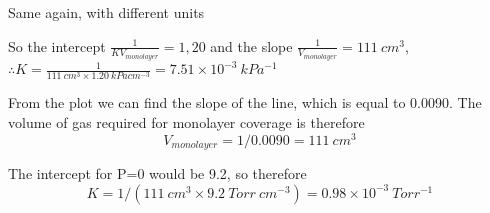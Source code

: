 \documentclass[ignorenonframetext]{beamer}
\begin{document}
\begin{example}{Same again, with different units}

So the intercept \(\frac{1}{KV_{monolayer}} = 1,20\) and the slope \(\frac{1}{V_{monolayer}} = 111\ cm^3\), \(\therefore K=\frac{1}{111\ cm^3\times 1.20\ kPacm^{-3}} = 7.51 \times 10^{-3}\ kPa^{-1}\)

From the plot we can find the slope of the line, which is equal to 0.0090. The volume of gas required for monolayer coverage is therefore \[V_{monolayer} = 1/0.0090 = 111\ cm^3\]

The intercept for P=0 would be 9.2, so therefore \[K = 1/(111\ cm^3\times 9.2\ Torr\ cm^{-3}) = 0.98\times10^{-3}\ Torr^{-1}\]
\end{example}
\end{document}
